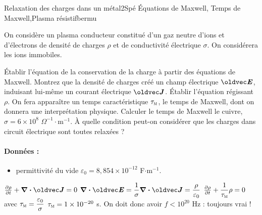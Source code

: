 
\begin{exercise}{Relaxation des charges dans un métal}{2}{Spé}
{\'Equations de Maxwell, Temps de Maxwell,Plasma résistif}{bermu}

On considère un plasma conducteur constitué d'un gaz neutre d'ions et d'électrons de densité de charges $\rho$ et de conductivité électrique $\sigma$. On considérera les ions immobiles.

\begin{questions}
    \questioncours Établir l'équation de la conservation de la charge à partir des équations de Maxwell.
    \question Montrez que la densité de charges créé un champ électrique $\vE$, induisant lui-même un courant électrique $\vJ$.
    \question \'Etablir l'équation régissant $\rho$. On fera apparaître un temps caractéristique $\tau_\textsc{m}$, le temps de Maxwell, dont on donnera une interprétation physique.
    \question Calculer le temps de Maxwell le cuivre, $\sigma = 6\times 10^8$ $\Omega^{-1}\cdot\text{m}^{-1}$. \`A quelle condition peut-on considérer que les charges dans circuit électrique sont toutes relaxées ?
\end{questions}

\paragraph{Données :}
\begin{itemize}
    \item permittivité du vide $\varepsilon_0 = 8,854\times 10^{-12}$ F$\cdot$m$^{-1}$.
\end{itemize}
\end{exercise}

\begin{solution}
\begin{questions}
    \question $\pdv{\rho}{t} + \div\vJ = 0$
    \question $\div \vE = \dfrac{1}{\sigma}\div\vJ =\dfrac{\rho}{\ep_0}$
    \question $\pdv{\rho}{t} + \dfrac{1}{\tau_\textsc{m}} \rho = 0$ avec $\tau_\textsc{m} = \dfrac{\varepsilon_0}{\sigma}$
    \question $\tau_\textsc{m} = 1 \times 10^{-20}$ s. On doit donc avoir $f < 10^{20}$ Hz : toujours vrai !
\end{questions}
\end{solution}



